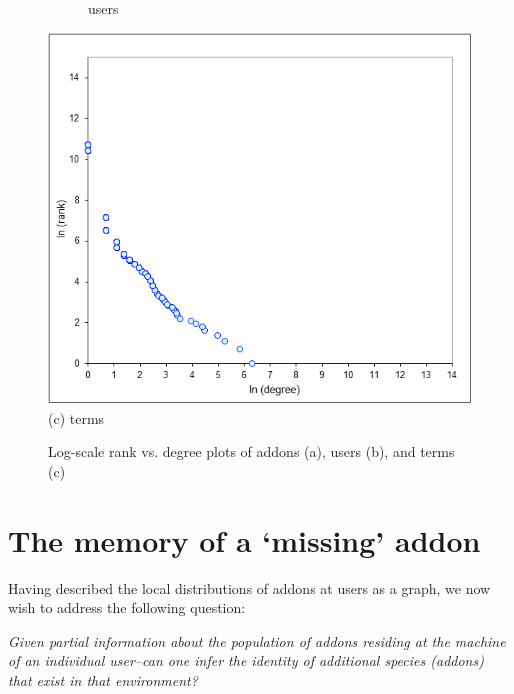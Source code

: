 \documentclass[ijoc,nonblindrev]{informs3} %
\numberwithin{equation}{subsection}
\begin{document}
\begin{figure}[t]
\begin{subfigure}[b]{0.49\textwidth}
\caption{users}
\end{subfigure}
	\centering
\includegraphics[scale=0.48]{figures/zipf-terms.png} \\
(c) terms \\
\caption{Log-scale rank vs. degree plots of addons (a), users (b), and terms (c)}
	\label{fig:zipf}
\end{figure}

\section{The memory of a `missing' addon}
\label{chap:user_ecosystem}

Having described the local distributions of addons at users as a graph, we now wish to address the following question:

{\it Given partial information about the population of addons residing at the machine of an individual user--can one infer the identity of additional species (addons) that exist in that environment?}
\end{document}
